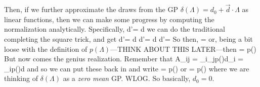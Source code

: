 Then, if we further approximate the draws from the GP $\delta(\Lambda) = d_0 + \vec{d}\cdot \Lambda$ as linear functions, then we can make some progress by computing the normalization analytically. Specifically, 
\beq
\int d\Lambda'\exp[g(\Lambda')] = \int d\Lambda\exp{}
\eeq
we can do the traditional completing the square trick, and get
\beq
\int d\Lambda'\exp[g(\Lambda')] = \int d\Lambda\exp{}
\eeq
\beq
\int d\Lambda'\exp[g(\Lambda')] = \int d\Lambda\exp{}
\eeq
\beq
\int d\Lambda'\exp[g(\Lambda')] = \exp{}
\eeq
So then,
\beq
{} = \exp{}
\eeq
or, being a bit loose with the definition of $p(\Lambda)$---THINK ABOUT THIS LATER---then
\beq
{} = p(\Lambda)\exp{}
\eeq
But now comes the genius realization. Remember that 
\beq
A_{ij} = \int \Lambda_i\Lambda_jp(\Lambda)d\Lambda \qquad\qquad \expect{\Lambda}_i = \int \Lambda_ip(\Lambda)d\Lambda
\eeq
and so we can put these back in and write
\beq
{} = p(\Lambda)\exp{}
\eeq
or
\beq
{} = p(\Lambda)\exp{}
\eeq
where we are thinking of $\delta(\Lambda)$ as a \textit{zero mean} GP. WLOG. So basically, $d_0 = 0$.


